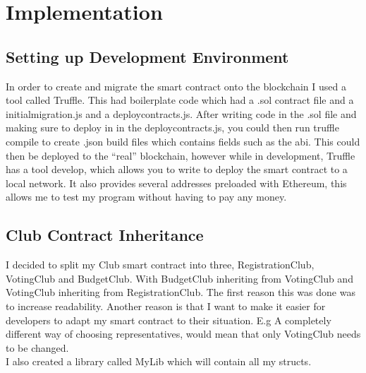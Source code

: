 \chapter{Implementation} \label{Chapter: Implementation}
\section{Setting up Development Environment}
In order to create and migrate the smart contract onto the blockchain I used a tool called Truffle. This had boilerplate code which had a .sol contract file and a initial\textunderscore migration.js and a deploy\textunderscore contracts.js. After writing code in the .sol file and making sure to deploy in in the deploy\textunderscore contracts.js, you could then run truffle compile to create .json build files which contains fields such as the abi. This could then be deployed to the “real” blockchain, however while in development, Truffle has a tool develop, which allows you to write to deploy the smart contract to a local network. It also provides several addresses preloaded with Ethereum, this allows me to test my program without having to pay any money.  
\section{Club Contract Inheritance}
I decided to split my Club smart contract into three, RegistrationClub, VotingClub and BudgetClub. With BudgetClub inheriting from VotingClub and VotingClub inheriting from RegistrationClub. The first reason this was done was to increase readability. Another reason is that I want to make it easier for developers to adapt my smart contract to their situation. E.g A completely different way of choosing representatives, would mean that only VotingClub needs to be changed. 
\\
I also created a library called MyLib which will contain all my structs.
